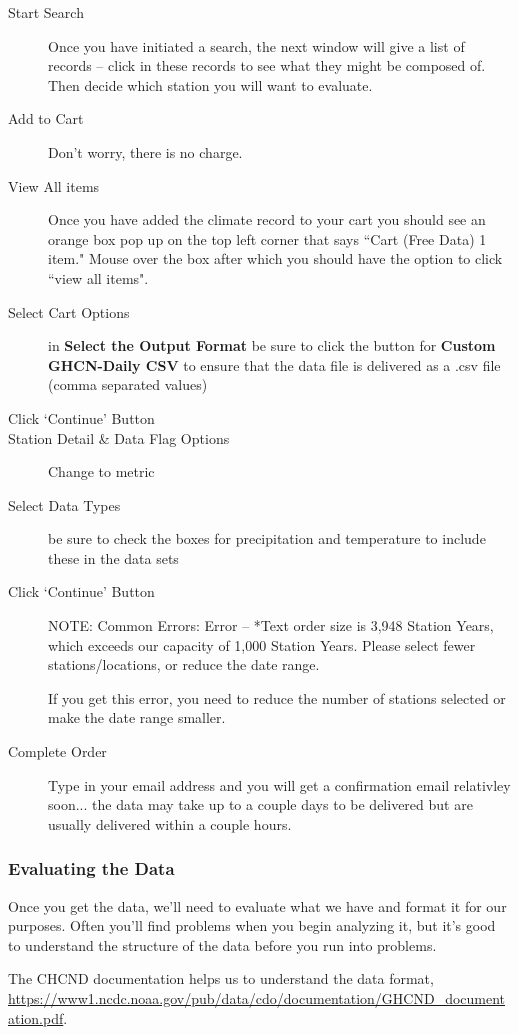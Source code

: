 \documentclass{article}\usepackage[]{graphicx}\usepackage[]{color}
\begin{document}
\begin{description}
  \item[Start Search] Once you have initiated a search, the next window will give a list of records -- click in these records to see what they might be composed of. Then decide which station you will want to evaluate.
  \item[Add to Cart] Don't worry, there is no charge. 
  \item[View All items] Once you have added the climate record to your cart you should see an orange box pop up on the top left corner that says ``Cart (Free Data) 1 item." Mouse over the box after which you should have the option to click ``view all items".
  \item[Select Cart Options] in \textbf{Select the Output Format} be sure to click the button for \textbf{Custom GHCN-Daily CSV} to ensure that the data file is delivered as a .csv file (comma separated values)
  \item[Click `Continue' Button]
  \item[Station Detail \& Data Flag Options] Change to metric
  \item[Select Data Types] be sure to check the boxes for precipitation and temperature to include these in the data sets
  \item[Click `Continue' Button] NOTE: Common Errors:
Error -- *Text order size is 3,948 Station Years, which exceeds our capacity of 1,000 Station Years. Please select fewer stations/locations, or reduce the date range.

If you get this error, you need to reduce the number of stations selected or make the date range smaller.
  
  \item[Complete Order] Type in your email address and you will get a confirmation email relativley soon... the data may take up to a couple days to be delivered but are usually delivered within a couple hours.
\end{description}


\subsubsection{Evaluating the Data}

Once you get the data, we'll need to evaluate what we have and format it for our purposes. Often you'll find problems when you begin analyzing it, but it's good to understand the structure of the data before you run into problems. 

The CHCND documentation helps us to understand the data format, \url{https://www1.ncdc.noaa.gov/pub/data/cdo/documentation/GHCND_documentation.pdf}.
\end{document}
